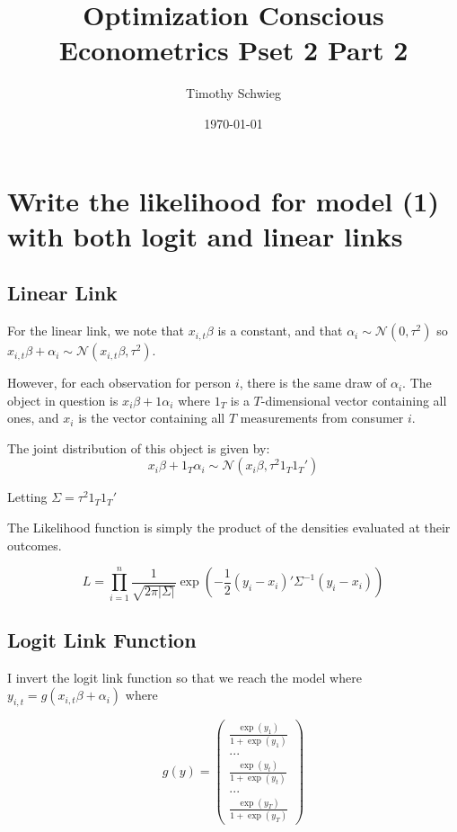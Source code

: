 \documentclass[12pt]{paper}
\author{Timothy Schwieg}
\date{\today}
\title{Optimization Conscious Econometrics Pset 2 Part 2}
\newcommand{\abs}[1]{\left \lvert #1 \right \rvert}
\newcommand{\inv}[1]{{#1}^{-1}}
\newcommand{\normal}{\mathcal{N}}
\begin{document}
\maketitle

\section{Write the likelihood for model (1) with both logit and linear
  links}

\subsection{Linear Link}

For the linear link, we note that $x_{i,t}\beta$ is a constant, and that
$\alpha_i \sim \normal(0,\tau^2)$ so $x_{i,t}\beta + \alpha_i \sim \normal( x_{i,t}\beta, \tau^2)$.

However, for each observation for person $i$, there is the same draw
of $\alpha_i$. The object in question is $x_i \beta + 1 \alpha_i$ where
$1_T$ is a $T$-dimensional vector containing all ones, and $x_i$ is
the vector containing all $T$ measurements from consumer $i$.

The joint distribution of this object is given by:
\begin{equation*}
 x_i \beta + 1_T \alpha_i \sim \normal(x_i \beta, \tau^2 1_T 1_T' ) 
\end{equation*}

Letting $\Sigma = \tau^2 1_T 1_T'$


The Likelihood function is simply the product of the densities
evaluated at their outcomes.

\begin{equation*}
  L = \prod_{i=1}^n \frac{1}{\sqrt{2 \pi \abs{\Sigma}}} \exp (
  -\frac{1}{2} (y_i - x_i)' \inv{\Sigma} (y_i - x_i) )
\end{equation*}


\subsection{Logit Link Function}

I invert the logit link function so that we reach the model where
$y_{i,t} = g( x_{i,t}\beta + \alpha_i)$ where

\begin{equation*}
  g(y) =
  \begin{pmatrix}
    \frac{\exp(y_1)}{1+\exp(y_1)}\\
    ...\\
    \frac{\exp(y_t)}{1+\exp(y_t)}\\
    ...\\
    \frac{\exp(y_T)}{1+\exp(y_T)}
  \end{pmatrix}
\end{equation*}
\end{document}
